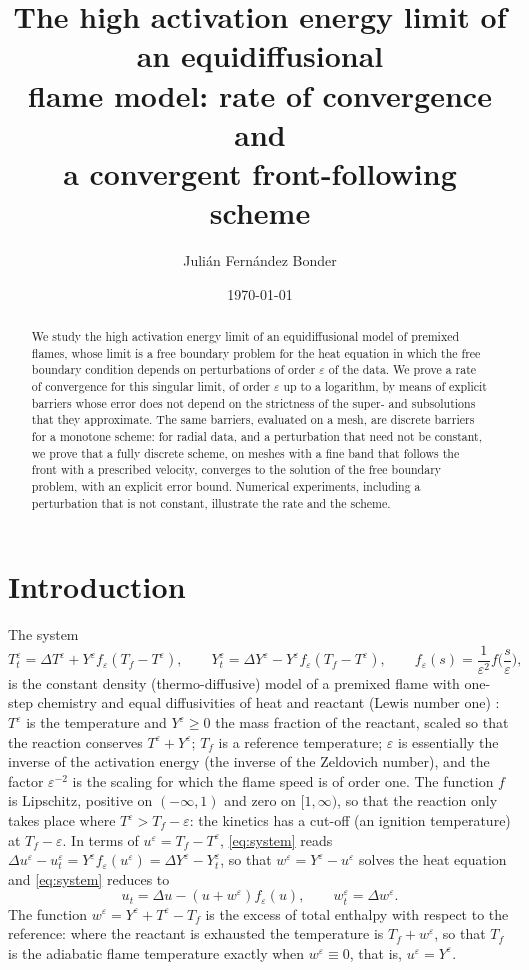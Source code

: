 \documentclass[11pt]{amsart}
\title[The high activation energy limit: rate and a convergent scheme]{The high activation energy limit of an equidiffusional\\ flame model: rate of convergence and\\ a convergent front-following scheme}
\author{Juli\'an Fern\'andez Bonder}
\date{\today}
\theoremstyle{definition}
\theoremstyle{remark}
\newcommand{\ve}{\varepsilon}
\begin{document}
\begin{abstract}
We study the high activation energy limit of an equidiffusional model of
premixed flames, whose limit is a free boundary problem for the heat equation
in which the free boundary condition depends on perturbations of order $\ve$ of
the data. We prove a rate of convergence for this singular limit, of order
$\ve$ up to a logarithm, by means of explicit barriers whose error does not
depend on the strictness of the super- and subsolutions that they approximate.
The same barriers, evaluated on a mesh, are discrete barriers for a monotone
scheme: for radial data, and a perturbation that need not be constant, we prove that a
fully discrete scheme, on meshes with
a fine band that follows the front with a prescribed velocity, converges to
the solution of the free boundary problem, with an explicit error bound.
Numerical experiments, including a perturbation that is not constant,
illustrate the rate and the scheme.
\end{abstract}

\maketitle

\section{Introduction}

The system
\begin{equation}\label{eq:system}
T^\ve_t=\Delta T^\ve+Y^\ve f_\ve(T_f-T^\ve),\qquad
Y^\ve_t=\Delta Y^\ve-Y^\ve f_\ve(T_f-T^\ve),\qquad f_\ve(s)=\frac1{\ve^2}f\Big(\frac s\ve\Big),
\end{equation}
is the constant density (thermo-diffusive) model of a premixed flame with one-step
chemistry and equal diffusivities of heat and reactant (Lewis number one)
\cite{BuckmasterLudford1982,MatkowskySivashinsky1979}: $T^\ve$ is the
temperature and $Y^\ve\ge0$ the mass fraction of the reactant, scaled so that the
reaction conserves $T^\ve+Y^\ve$; $T_f$ is a reference temperature; $\ve$ is
essentially the inverse of the activation energy (the inverse of the Zeldovich number),
and the factor $\ve^{-2}$ is the scaling for which the flame speed is of order one. The
function $f$ is Lipschitz, positive on $(-\infty,1)$
and zero on $[1,\infty)$, so that the reaction only takes place where
$T^\ve>T_f-\ve$: the kinetics has a cut-off (an ignition temperature) at $T_f-\ve$. In
terms of $u^\ve=T_f-T^\ve$, \eqref{eq:system} reads
$\Delta u^\ve-u^\ve_t=Y^\ve f_\ve(u^\ve)=\Delta Y^\ve-Y^\ve_t$, so that
$w^\ve=Y^\ve-u^\ve$ solves the heat equation and \eqref{eq:system} reduces to
\begin{equation}\label{eq:Peps}\tag{$P_\ve$}
u_t=\Delta u-(u+w^\ve)f_\ve(u),\qquad w^\ve_t=\Delta w^\ve.
\end{equation}
The function $w^\ve=Y^\ve+T^\ve-T_f$ is the excess of total enthalpy with respect to the
reference: where the reactant is exhausted the temperature is $T_f+w^\ve$, so that $T_f$
is the adiabatic flame temperature exactly when $w^\ve\equiv0$, that is, $u^\ve=Y^\ve$.
\end{document}
